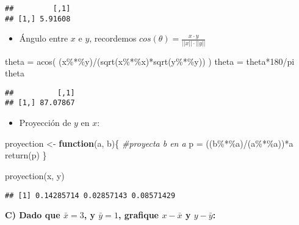 \documentclass[
]{article}
\newenvironment{Shaded}{\begin{snugshade}}{\end{snugshade}}
\newcommand{\CommentTok}[1]{\textcolor[rgb]{0.56,0.35,0.01}{\textit{#1}}}
\newcommand{\ControlFlowTok}[1]{\textcolor[rgb]{0.13,0.29,0.53}{\textbf{#1}}}
\newcommand{\DecValTok}[1]{\textcolor[rgb]{0.00,0.00,0.81}{#1}}
\newcommand{\FunctionTok}[1]{\textcolor[rgb]{0.00,0.00,0.00}{#1}}
\newcommand{\NormalTok}[1]{#1}
\newcommand{\OtherTok}[1]{\textcolor[rgb]{0.56,0.35,0.01}{#1}}
\newcommand{\SpecialCharTok}[1]{\textcolor[rgb]{0.00,0.00,0.00}{#1}}
\providecommand{\tightlist}{%
  \setlength{\itemsep}{0pt}\setlength{\parskip}{0pt}}
\begin{document}
\begin{verbatim}
##         [,1]
## [1,] 5.91608
\end{verbatim}

\begin{itemize}
\tightlist
\item
  Ángulo entre \(x\) e \(y\), recordemos
  \(cos(\theta) = \frac{x \cdot y}{||x|| \cdot ||y||}\)
\end{itemize}

\begin{Shaded}
\begin{Highlighting}[]
\NormalTok{theta }\OtherTok{=} \FunctionTok{acos}\NormalTok{( (x}\SpecialCharTok{\%*\%}\NormalTok{y)}\SpecialCharTok{/}\NormalTok{(}\FunctionTok{sqrt}\NormalTok{(x}\SpecialCharTok{\%*\%}\NormalTok{x)}\SpecialCharTok{*}\FunctionTok{sqrt}\NormalTok{(y}\SpecialCharTok{\%*\%}\NormalTok{y)) )}
\NormalTok{theta }\OtherTok{=}\NormalTok{ theta}\SpecialCharTok{*}\DecValTok{180}\SpecialCharTok{/}\NormalTok{pi}
\NormalTok{theta}
\end{Highlighting}
\end{Shaded}

\begin{verbatim}
##          [,1]
## [1,] 87.07867
\end{verbatim}

\begin{itemize}
\tightlist
\item
  Proyección de \(y\) en \(x\):
\end{itemize}

\begin{Shaded}
\begin{Highlighting}[]
\NormalTok{proyection }\OtherTok{\textless{}{-}} \ControlFlowTok{function}\NormalTok{(a, b)\{}
  \CommentTok{\#proyecta b en a}
\NormalTok{  p }\OtherTok{=}\NormalTok{ ((b}\SpecialCharTok{\%*\%}\NormalTok{a)}\SpecialCharTok{/}\NormalTok{(a}\SpecialCharTok{\%*\%}\NormalTok{a))}\SpecialCharTok{*}\NormalTok{a}
  \FunctionTok{return}\NormalTok{(p)}
\NormalTok{\}}

\FunctionTok{proyection}\NormalTok{(x, y)}
\end{Highlighting}
\end{Shaded}

\begin{verbatim}
## [1] 0.14285714 0.02857143 0.08571429
\end{verbatim}

\textbf{C) Dado que \(\bar{x} = 3\), y \(\bar{y} = 1\), grafique
\(x-\bar{x}\) y \(y-\bar{y}\):}
\end{document}
